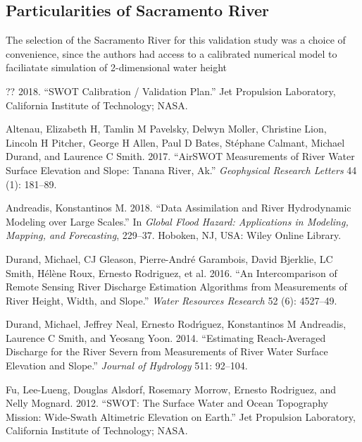 \documentclass[]{book}
\begin{document}
\hypertarget{particularities-of-sacramento-river}{%
\subsection{Particularities of Sacramento River}\label{particularities-of-sacramento-river}}

The selection of the Sacramento River for this validation study was a choice of convenience, since the authors had access to a calibrated numerical model to faciliatate simulation of 2-dimensional water height

\hypertarget{refs}{}
\leavevmode\hypertarget{ref-swot2018calval}{}%
?? 2018. ``SWOT Calibration / Validation Plan.'' Jet Propulsion Laboratory, California Institute of Technology; NASA.

\leavevmode\hypertarget{ref-altenau2017}{}%
Altenau, Elizabeth H, Tamlin M Pavelsky, Delwyn Moller, Christine Lion, Lincoln H Pitcher, George H Allen, Paul D Bates, Stéphane Calmant, Michael Durand, and Laurence C Smith. 2017. ``AirSWOT Measurements of River Water Surface Elevation and Slope: Tanana River, Ak.'' \emph{Geophysical Research Letters} 44 (1): 181--89.

\leavevmode\hypertarget{ref-andreadis2018}{}%
Andreadis, Konstantinos M. 2018. ``Data Assimilation and River Hydrodynamic Modeling over Large Scales.'' In \emph{Global Flood Hazard: Applications in Modeling, Mapping, and Forecasting}, 229--37. Hoboken, NJ, USA: Wiley Online Library.

\leavevmode\hypertarget{ref-durand2016}{}%
Durand, Michael, CJ Gleason, Pierre-André Garambois, David Bjerklie, LC Smith, Hélène Roux, Ernesto Rodriguez, et al. 2016. ``An Intercomparison of Remote Sensing River Discharge Estimation Algorithms from Measurements of River Height, Width, and Slope.'' \emph{Water Resources Research} 52 (6): 4527--49.

\leavevmode\hypertarget{ref-durand2014}{}%
Durand, Michael, Jeffrey Neal, Ernesto Rodrı́guez, Konstantinos M Andreadis, Laurence C Smith, and Yeosang Yoon. 2014. ``Estimating Reach-Averaged Discharge for the River Severn from Measurements of River Water Surface Elevation and Slope.'' \emph{Journal of Hydrology} 511: 92--104.

\leavevmode\hypertarget{ref-fu2012swot}{}%
Fu, Lee-Lueng, Douglas Alsdorf, Rosemary Morrow, Ernesto Rodriguez, and Nelly Mognard. 2012. ``SWOT: The Surface Water and Ocean Topography Mission: Wide-Swath Altimetric Elevation on Earth.'' Jet Propulsion Laboratory, California Institute of Technology; NASA.
\end{document}
